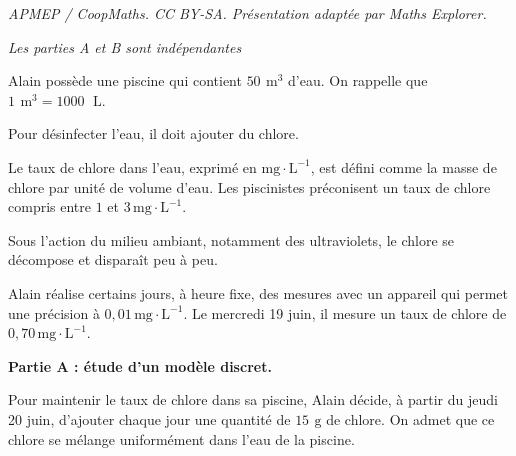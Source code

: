 \documentclass[10pt]{article}
\providecommand{\np}[2][]{{#2~#1}}
\begin{document}
\noindent\textit{APMEP / CoopMaths. CC BY-SA. Présentation adaptée par Maths Explorer.}\par\medskip
\medskip

\emph{Les parties {\rm A} et {\rm B} sont indépendantes}

\medskip
Alain possède une piscine qui contient $50\, \mathrm{~m}^{3}$ d'eau. On rappelle que $1\, \mathrm{~m}^{3}=\np{1000}\, \mathrm{~L}$.

Pour désinfecter l'eau, il doit ajouter du chlore.

Le taux de chlore dans l'eau, exprimé en $\mathrm{mg}\cdot \mathrm{L}^{-1}$, est défini comme la masse de chlore par unité de volume d'eau. Les piscinistes préconisent un taux de chlore compris entre $1$ et $3\, \mathrm{mg \cdot L}^{-1}$.

Sous l'action du milieu ambiant, notamment des ultraviolets, le chlore se décompose et disparaît peu à peu.

Alain réalise certains jours, à heure fixe, des mesures avec un appareil qui permet une précision à $0,01 \,\mathrm{mg \cdot L}^{-1}$. Le mercredi 19 juin, il mesure un taux de chlore de $0,70\,\mathrm{mg \cdot L}^{-1}$.

\medskip

\textbf{Partie A : étude d'un modèle discret.}

\smallskip
Pour maintenir le taux de chlore dans sa piscine, Alain décide, à partir du jeudi 20 juin, d'ajouter chaque jour une quantité de $15\, \mathrm{~g}$ de chlore. On admet que ce chlore se mélange uniformément dans l'eau de la piscine.
\end{document}
